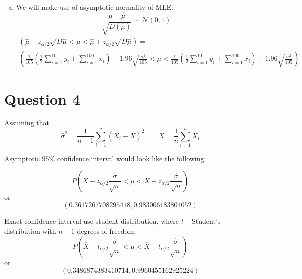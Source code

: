 \documentclass[11pt, oneside]{article}
\begin{document}
\begin{enumerate}[(a)]
\item We will make use of asymptotic normality of MLE:
\[
\frac{\mu - \hat\mu}{\sqrt{D(\hat\mu)}} \sim \mathcal{N} (0, 1)
\]
\begin{gather*}
	\left( \hat\mu - z_{\alpha / 2}\sqrt{D\hat\mu} < \mu < \hat\mu + z_{\alpha / 2}\sqrt{D\hat\mu}\right) = \\
	\left( \frac{1}{105}\left(\frac{1}{2}\sum_{i=1}^{10}y_{i} + \sum_{i=1}^{100} x_{i}\right) - 1.96\sqrt{ \frac{\sigma^{2}}{105}} < \mu < \frac{1}{105}\left(\frac{1}{2}\sum_{i=1}^{10}y_{i} + \sum_{i=1}^{100} x_{i}\right) + 1.96\sqrt{ \frac{\sigma^{2}}{105}}\right)
\end{gather*}
\end{enumerate}

\clearpage
\section*{Question 4}

Assuming that 
\[
\hat{\sigma}^{2} = \frac{1}{n-1} \sum_{i=1}^{n}\left( X_{i} - \overline{X} \right)^{2} \quad\quad \overline{X} = \frac{1}{n} \sum_{i=1}^{n}X_{i}
\]

Asymptotic $ 95\% $ confidence interval would look like the following:

\[
P\left( \overline{X} - z_{\alpha / 2}\frac{\hat{\sigma}}{\sqrt{n}} < \mu < \overline{X} + z_{\alpha / 2}\frac{\hat{\sigma}}{\sqrt{n}} \right)
\]
or 
\[
(0.3617267708295418, 0.983006183804052)\]

Exact confidence interval use student distribution, where $ t $ -- Student's distribution with $ n-1 $ degrees of freedom:
\[
P\left( \overline{X} - t_{\alpha / 2}\frac{\hat{\sigma}}{\sqrt{n}} < \mu < \overline{X} + t_{\alpha / 2}\frac{\hat{\sigma}}{\sqrt{n}} \right)
\]
or
\[
(0.3486874383410714, 0.9960455162925224)\]

\clearpage
\end{document}

